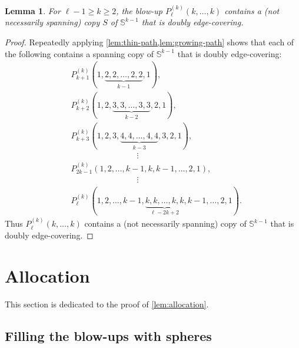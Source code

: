 \documentclass[12pt,reqno]{amsart}
\theoremstyle{plain}
\newtheorem{lemma}[theorem]{Lemma}
\theoremstyle{definition}
\numberwithin{equation}{section}
\renewcommand{\geq}{\geqslant}
\newcommand{\bS}{\mathbb{S}}
\begin{document}
	\begin{lemma}\label{lem:tightpathsphere}
		For $\ell - 1 \geq k \geq 2$, the blow-up $P_\ell^{(k)}(k, \dotsc, k)$ contains a \textup{(}not necessarily spanning\textup{)} copy $S$ of $\bS^{k - 1}$ that is doubly edge-covering.
	\end{lemma}
	
	\begin{proof}
		Repeatedly applying \cref{lem:thin-path,lem:growing-path} shows that each of the following contains a spanning copy of $\bS^{k - 1}$ that is doubly edge-covering:
		\begin{align*}
			& P_{k + 1}^{(k)}(1, \underbrace{2, 2, \dotsc, 2, 2}_{k - 1}, 1),                                          \\
			& P_{k + 2}^{(k)}(1, 2, \underbrace{3, 3, \dotsc, 3, 3}_{k - 2}, 2, 1),                                    \\
			& P_{k + 3}^{(k)}(1, 2, 3, \underbrace{4, 4, \dotsc, 4, 4}_{k - 3}, 3, 2, 1),                              \\
			& \qquad \qquad \qquad \qquad \vdots                                                                       \\
			& P_{2k - 1}^{(k)}(1, 2, \dotsc, k - 1, k, k - 1, \dotsc, 2, 1),                                           \\
			& \qquad \qquad \qquad \qquad \vdots                                                                       \\
			& P_\ell^{(k)}(1, 2, \dotsc, k - 1, \underbrace{k, k, \dotsc, k, k}_{\ell - 2k + 2}, k - 1, \dotsc, 2, 1).
		\end{align*}
		Thus $P_\ell^{(k)}(k, \dotsc, k)$ contains a (not necessarily spanning) copy of $\bS^{k - 1}$ that is doubly edge-covering.
	\end{proof}
	
	
	
	
	
	\section{Allocation}
	\label{sec:allocation}
	
	This section is dedicated to the proof of \cref{lem:allocation}.
	
	\subsection{Filling the blow-ups with spheres}
	
\end{document}
